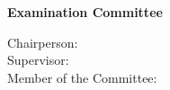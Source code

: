 \begin{titlepage}
\begin{center}
{\Large \textbf{Examination Committee}}\\[0.75cm]

\begin{minipage}[t]{.4\textwidth}
  \begin{flushright}
    {\large Chairperson:\:}\\
    {\large Supervisor:\:}\\
    {\large Member of the Committee:\:}
  \end{flushright}
\end{minipage}%
\begin{minipage}[t]{.6\textwidth}
  \begin{flushleft}
    {\large \Chairperson}\\
    {\large \Advisor}\\
    {\large \CommitteeMembers}
  \end{flushleft}
\end{minipage}\\[6.5cm]

{\Large \textbf{\Month\:\Year}}\\
\end{center}
\end{titlepage}
